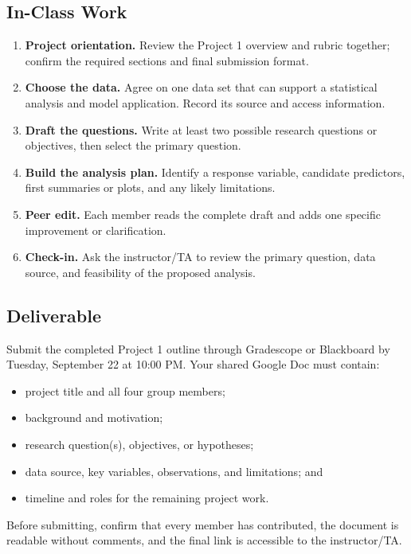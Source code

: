 \documentclass{article}
\newcommand{\submissionplatform}{Gradescope or Blackboard}
\newcommand{\duedate}{Tuesday, September 22 at 10:00 PM}
\begin{document}
\subsection*{In-Class Work}
\begin{enumerate}[label={\bfseries (\Alph*)},itemsep=.5em]
  \item \textbf{Project orientation.} Review the Project 1 overview and rubric together; confirm the required sections and final submission format.
  \item \textbf{Choose the data.} Agree on one data set that can support a statistical analysis and model application. Record its source and access information.
  \item \textbf{Draft the questions.} Write at least two possible research questions or objectives, then select the primary question.
  \item \textbf{Build the analysis plan.} Identify a response variable, candidate predictors, first summaries or plots, and any likely limitations.
  \item \textbf{Peer edit.} Each member reads the complete draft and adds one specific improvement or clarification.
  \item \textbf{Check-in.} Ask the instructor/TA to review the primary question, data source, and feasibility of the proposed analysis.
\end{enumerate}

\subsection*{Deliverable}
Submit the completed Project 1 outline through \submissionplatform{} by \duedate{}. Your shared Google Doc must contain:
\begin{itemize}[itemsep=.25em]
  \item project title and all four group members;
  \item background and motivation;
  \item research question(s), objectives, or hypotheses;
  \item data source, key variables, observations, and limitations; and
  \item timeline and roles for the remaining project work.
\end{itemize}
Before submitting, confirm that every member has contributed, the document is readable without comments, and the final link is accessible to the instructor/TA.
\end{document}
